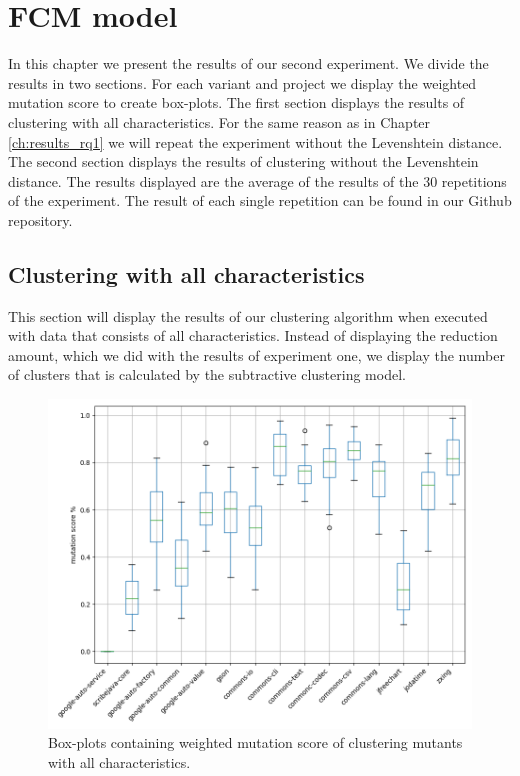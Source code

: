 \documentclass[../../main]{subfiles}
\begin{document}
\section{FCM model}
\label{ch:results_rq2}
In this chapter we present the results of our second experiment.
We divide the results in two sections. 
For each variant and project we display the weighted mutation score to create box-plots.
The first section displays the results of clustering with all characteristics.
For the same reason as in Chapter \ref{ch:results_rq1} we will repeat the experiment without the Levenshtein distance.
The second section displays the results of clustering without the Levenshtein distance.
\newline
The results displayed are the average of the results of the 30 repetitions of the experiment.
The result of each single repetition can be found in our Github repository\cite{rbasarat-repo}.

\subsection{Clustering with all characteristics}
This section will display the results of our clustering algorithm when executed with data that consists of all characteristics. 
Instead of displaying the reduction amount, which we did with the results of experiment one, we display the number of clusters that is calculated by the subtractive clustering model.

\begin{figure}[H]
\includegraphics[width=\textwidth]{images/fcm_summary/fcm_full.png}
\caption{\label{box:clustering_fcm_all_25}Box-plots containing weighted mutation score of clustering mutants with all characteristics.}
\end{figure}
\end{document}
